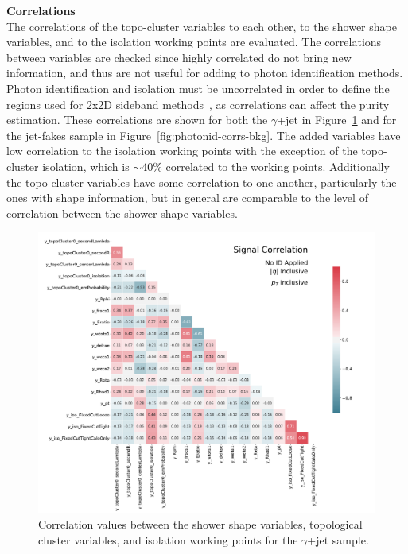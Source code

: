 \noindent\textbf{Correlations}\\
\indent The correlations of the topo-cluster variables to each other, to the shower shape variables, and to the isolation working points are evaluated. The correlations between variables are checked since highly correlated do not bring new information, and thus are not useful for adding to photon identification methods. Photon identification and isolation must be uncorrelated in order to define the regions used for 2x2D sideband methods~\cite{2x2d-definition}, as correlations can affect the purity estimation. These correlations are shown for both the $\gamma$+jet in Figure~\ref{fig:photonid-corrs-sig} and for the jet-fakes sample in Figure~\ref{fig:photonid-corrs-bkg}. The added variables have low correlation to the isolation working points with the exception of the topo-cluster isolation, which is $\sim$40\% correlated to the working points. Additionally the topo-cluster variables have some correlation to one another, particularly the ones with shape information, but in general are comparable to the level of correlation between the shower shape variables.

\begin{figure}[!hp]
    \centering
    \includegraphics[width=\textwidth]{chapters/chapter4_photonID/images/sig_none_corr.pdf}
    \caption[Correlation values between the shower shape variables, topological cluster variables, and isolation working points for the $\gamma$+jet sample] {Correlation values between the shower shape variables, topological cluster variables, and isolation working points for the $\gamma$+jet sample.}
    \label{fig:photonid-corrs-sig}
\end{figure}

